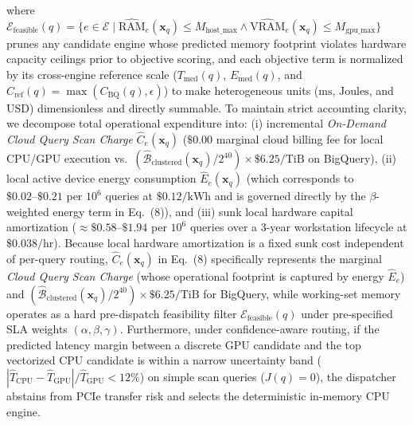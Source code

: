 \documentclass[10pt,a4paper]{article}
\begin{document}
where $\mathcal{E}_{\text{feasible}}(q) = \{e \in \mathcal{E} \mid \widehat{\text{RAM}}_e(\mathbf{x}_q) \le M_{\text{host\_max}} \land \widehat{\text{VRAM}}_e(\mathbf{x}_q) \le M_{\text{gpu\_max}}\}$ prunes any candidate engine whose predicted memory footprint violates hardware capacity ceilings prior to objective scoring, and each objective term is normalized by its cross-engine reference scale ($T_{\text{med}}(q)$, $E_{\text{med}}(q)$, and $C_{\text{ref}}(q) = \max(C_{\text{BQ}}(q), \epsilon)$) to make heterogeneous units ($\text{ms}$, $\text{Joules}$, and $\text{USD}$) dimensionless and directly summable. To maintain strict accounting clarity, we decompose total operational expenditure into: (i) incremental \emph{On-Demand Cloud Query Scan Charge} $\hat{C}_e(\mathbf{x}_q)$ ($\$0.00$ marginal cloud billing fee for local CPU/GPU execution vs.\ $(\hat{\mathcal{B}}_{\text{clustered}}(\mathbf{x}_q)/2^{40})\times\$6.25/\text{TiB}$ on BigQuery), (ii) local active device energy consumption $\hat{E}_e(\mathbf{x}_q)$ (which corresponds to $\$0.02\text{--}\$0.21$ per $10^6$ queries at $\$0.12/\text{kWh}$ and is governed directly by the $\beta$-weighted energy term in Eq.~(8)), and (iii) sunk local hardware capital amortization ($\approx\$0.58\text{--}\$1.94$ per $10^6$ queries over a 3-year workstation lifecycle at $\$0.038/\text{hr}$). Because local hardware amortization is a fixed sunk cost independent of per-query routing, $\hat{C}_e(\mathbf{x}_q)$ in Eq.~(8) specifically represents the marginal \emph{Cloud Query Scan Charge} (whose operational footprint is captured by energy $\hat{E}_e$) and $(\hat{\mathcal{B}}_{\text{clustered}}(\mathbf{x}_q)/2^{40})\times \$6.25\text{/TiB}$ for BigQuery, while working-set memory operates as a hard pre-dispatch feasibility filter $\mathcal{E}_{\text{feasible}}(q)$ under pre-specified SLA weights $(\alpha,\beta,\gamma)$. Furthermore, under confidence-aware routing, if the predicted latency margin between a discrete GPU candidate and the top vectorized CPU candidate is within a narrow uncertainty band ($|\hat{T}_{\text{CPU}} - \hat{T}_{\text{GPU}}|/\hat{T}_{\text{GPU}} < 12\%$) on simple scan queries ($J(q)=0$), the dispatcher abstains from PCIe transfer risk and selects the deterministic in-memory CPU engine.
\end{document}
